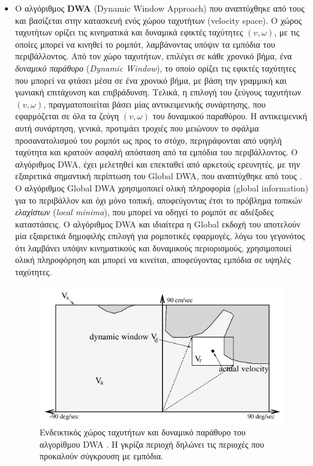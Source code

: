 \begin{itemize}
\item	Ο αλγόριθμος \textbf{DWA} (Dynamic Window Approach) που αναπτύχθηκε από τους \citeauthor{dwa} \cite{dwa} και βασίζεται στην κατασκευή ενός χώρου ταχυτήτων (velocity space). Ο χώρος ταχυτήτων ορίζει τις κινηματικά και δυναμικά εφικτές ταχύτητες $(v,\omega)$, με τις οποίες μπορεί να κινηθεί το ρομπότ, λαμβάνοντας υπόψιν τα εμπόδια του περιβάλλοντος. Από τον χώρο ταχυτήτων, επιλέγει σε κάθε χρονικό βήμα, ένα \textit{δυναμικό παράθυρο} (\textit{Dynamic Window}), το οποίο ορίζει τις εφικτές ταχύτητες που μπορεί να φτάσει μέσα σε ένα χρονικό βήμα, με βάση την γραμμική και γωνιακή επιτάχυνση και επιβράδυνση. Τελικά, η επιλογή του ζεύγους ταχυτήτων $(v,\omega)$, πραγματοποιείται βάσει μίας αντικειμενικής συνάρτησης, που εφαρμόζεται σε όλα τα ζεύγη $(v, \omega)$ του δυναμικού παραθύρου. Η αντικειμενική αυτή συνάρτηση, γενικά, προτιμάει τροχιές που μειώνουν το σφάλμα προσανατολισμού του ρομπότ ως προς το στόχο, περιγράφονται από υψηλή ταχύτητα και κρατούν ασφαλή απόσταση από τα εμπόδια του περιβάλλοντος. Ο αλγόριθμος DWA, έχει μελετηθεί και επεκταθεί από αρκετούς ερευνητές, με την εξαιρετικά σημαντική περίπτωση του Global DWA, που αναπτύχθηκε από τους \citeauthor{gdwa} \cite{gdwa}. Ο αλγόριθμος Global DWA χρησιμοποιεί ολική πληροφορία (global information) για το περιβάλλον και όχι μόνο τοπική, αποφεύγοντας έτσι το πρόβλημα \textit{τοπικών ελαχίστων} (\textit{local minima}), που μπορεί να οδηγεί το ρομπότ σε αδιέξοδες καταστάσεις. Ο αλγόριθμος DWA και ιδιαίτερα η Global εκδοχή του αποτελούν μία εξαιρετικά δημοφιλής επιλογή για ρομποτικές εφαρμογές, λόγω του γεγονότος ότι λαμβάνει υπόψιν κινηματικούς και δυναμικούς περιορισμούς, χρησιμοποιεί ολική πληροφόρηση και μπορεί να κινείται, αποφεύγοντας εμπόδια σε υψηλές ταχύτητες.

\begin{figure}[!ht]
	\centering
	\includegraphics[width=0.4\linewidth]{Chapters/Chapter3/Figures/dwa.png}
	\caption[Ενδεικτικός χώρος ταχυτήτων και δυναμικό παράθυρο του αλγορίθμου DWA.]{ Ενδεικτικός χώρος ταχυτήτων και δυναμικό παράθυρο του αλγορίθμου DWA \cite{dwa}. Η γκρίζα περιοχή δηλώνει τις περιοχές που προκαλούν σύγκρουση με εμπόδια.}
	\label{fig:dwa}
\end{figure}	


\end{itemize}
